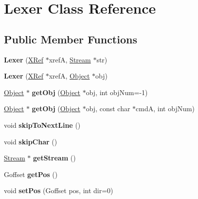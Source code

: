\hypertarget{class_lexer}{}\section{Lexer Class Reference}
\label{class_lexer}
\subsection*{Public Member Functions}
\begin{DoxyCompactItemize}
\item 
\mbox{\label{class_lexer_ab5c2b913136fe929fbf724b57f2de7ad}} 
{\bfseries Lexer} (\hyperlink{class_x_ref}{X\+Ref} $\ast$xrefA, \hyperlink{class_stream}{Stream} $\ast$str)
\item 
\mbox{\label{class_lexer_a07af88a290faaa76eea720454f414942}} 
{\bfseries Lexer} (\hyperlink{class_x_ref}{X\+Ref} $\ast$xrefA, \hyperlink{class_object}{Object} $\ast$obj)
\item 
\mbox{\label{class_lexer_a171de7d21a76ff7d345afb2de9be8e20}} 
\hyperlink{class_object}{Object} $\ast$ {\bfseries get\+Obj} (\hyperlink{class_object}{Object} $\ast$obj, int obj\+Num=-\/1)
\item 
\mbox{\label{class_lexer_ab13305ee80aee655251887043ec24398}} 
\hyperlink{class_object}{Object} $\ast$ {\bfseries get\+Obj} (\hyperlink{class_object}{Object} $\ast$obj, const char $\ast$cmdA, int obj\+Num)
\item 
\mbox{\label{class_lexer_a67971901e84675af1396af74e8d6ac16}} 
void {\bfseries skip\+To\+Next\+Line} ()
\item 
\mbox{\label{class_lexer_a7a1347d72726d368888bd80365bd721f}} 
void {\bfseries skip\+Char} ()
\item 
\mbox{\label{class_lexer_ab21a193014bb1fe4e86851e6f95e3cef}} 
\hyperlink{class_stream}{Stream} $\ast$ {\bfseries get\+Stream} ()
\item 
\mbox{\label{class_lexer_a0fce9a97b30e7cd6ece46bbd60135a64}} 
Goffset {\bfseries get\+Pos} ()
\item 
\mbox{\label{class_lexer_a696cafe58c9450214a348637210c12b4}} 
void {\bfseries set\+Pos} (Goffset pos, int dir=0)
\end{DoxyCompactItemize}
